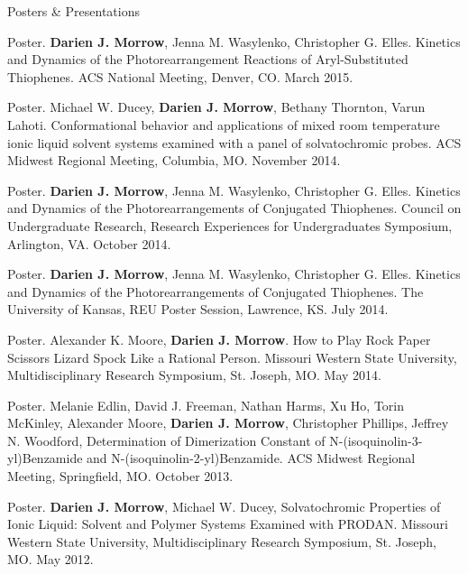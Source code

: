 \documentclass{resume} %
\begin{document}
\begin{rSection}{Posters \& Presentations}
	
	
\begin{etaremune}

	\item Poster. \textbf{Darien J. Morrow}, Jenna M. Wasylenko, Christopher G. Elles. Kinetics and
	Dynamics of the Photorearrangement Reactions of Aryl-Substituted Thiophenes. ACS National Meeting, Denver, CO. March 2015. 
	
	\item Poster. Michael W. Ducey, \textbf{Darien J. Morrow}, Bethany Thornton, Varun Lahoti. Conformational behavior and applications of mixed room temperature ionic liquid solvent systems examined with a panel of solvatochromic probes. ACS Midwest Regional Meeting, Columbia, MO. November 2014.
	
	\item Poster. \textbf{Darien J. Morrow}, Jenna M. Wasylenko, Christopher G. Elles. Kinetics and Dynamics of the Photorearrangements of Conjugated Thiophenes. Council on Undergraduate Research, Research Experiences for Undergraduates Symposium, Arlington, VA. October 2014.
	
	\item Poster. \textbf{Darien J. Morrow}, Jenna M. Wasylenko, Christopher G. Elles. Kinetics and 
	Dynamics of the Photorearrangements of Conjugated Thiophenes. The University of Kansas, REU Poster Session, Lawrence, KS. July 
	2014. 
	
	\item Poster. Alexander K. Moore, \textbf{Darien J. Morrow}. How to Play Rock Paper Scissors Lizard Spock Like a Rational Person. Missouri Western State University, Multidisciplinary Research Symposium, St. Joseph, MO. May 2014.
	
	\item Poster. Melanie Edlin, David J. Freeman, Nathan Harms, Xu Ho, Torin McKinley, Alexander Moore, \textbf{Darien J. Morrow}, Christopher Phillips, Jeffrey N. Woodford, Determination of Dimerization Constant of N-(isoquinolin-3-yl)Benzamide and N-(isoquinolin-2-yl)Benzamide. ACS Midwest Regional Meeting, Springfield, MO. October 2013.
	
	\item Poster. \textbf{Darien J. Morrow}, Michael W. Ducey, Solvatochromic Properties of Ionic Liquid: Solvent and Polymer Systems Examined with PRODAN. Missouri Western State University, Multidisciplinary Research Symposium, St. Joseph, MO. May 2012.
	
\end{etaremune}
\end{rSection}
\end{document}

